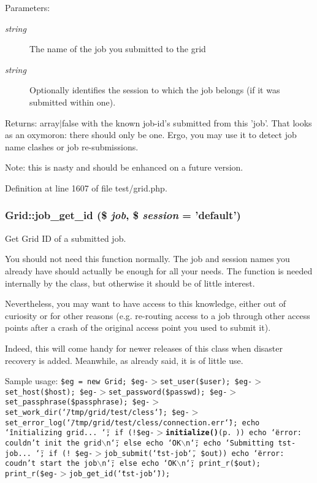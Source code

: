 \begin{Desc}
\item[Parameters:]
\begin{description}
\item[{\em string}]The name of the job you submitted to the grid \item[{\em string}]Optionally identifies the session to which the job belongs (if it was submitted within one).\end{description}
\end{Desc}
\begin{Desc}
\item[Returns:]array$|$false with the known job-id's submitted from this 'job'. That looks as an oxymoron: there should only be one. Ergo, you may use it to detect job name clashes or job re-submissions.\end{Desc}
\begin{Desc}
\item[Note:]this is nasty and should be enhanced on a future version. \end{Desc}


Definition at line 1607 of file test/grid.php.
\subsubsection{\setlength{\rightskip}{0pt plus 5cm}Grid::job\_\-get\_\-id (\$ {\em job}, \$ {\em session} = 'default')}\label{classGrid_a22}


Get Grid ID of a submitted job. 

You should not need this function normally. The job and session names you already have should actually be enough for all your needs. The function is needed internally by the class, but otherwise it should be of little interest.

Nevertheless, you may want to have access to this knowledge, either out of curiosity or for other reasons (e.g. re-routing access to a job through other access points after a crash of the original access point you used to submit it).

Indeed, this will come handy for newer releases of this class when disaster recovery is added. Meanwhile, as already said, it is of little use.

Sample usage: {\tt  \$eg = new Grid; \$eg-$>$set\_\-user(\$user); \$eg-$>$set\_\-host(\$host); \$eg-$>$set\_\-password(\$passwd); \$eg-$>$set\_\-passphrase(\$passphrase); \$eg-$>$set\_\-work\_\-dir(\char`\"{}/tmp/grid/test/cless\char`\"{}); \$eg-$>$set\_\-error\_\-log(\char`\"{}/tmp/grid/test/cless/connection.err\char`\"{}); echo \char`\"{}initializing grid... \char`\"{}; if (!\$eg-$>${\bf initialize()}{\rm (p.\,\pageref{classGrid_a11})}) echo \char`\"{}error: couldn't init the grid$\backslash$n\char`\"{}; else echo \char`\"{}OK$\backslash$n\char`\"{}; echo \char`\"{}Submitting tst-job... \char`\"{}; if (! \$eg-$>$job\_\-submit(\char`\"{}tst-job\char`\"{}, \$out)) echo \char`\"{}error: coudn't start the job$\backslash$n\char`\"{}; else echo \char`\"{}OK$\backslash$n\char`\"{}; print\_\-r(\$out); print\_\-r(\$eg-$>$job\_\-get\_\-id(\char`\"{}tst-job\char`\"{})); }

